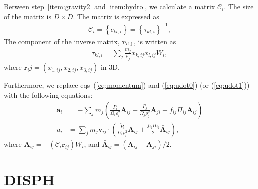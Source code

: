\documentclass[fleqn,dvipdfmx]{article}
\begin{document}
Between step~\ref{item:gravity2} and \ref{item:hydro}, we calculate a
matrix $\mathcal{C}_i$. The size of the matrix is $D \times D$. The
matrix is expressed as
\begin{align}
  \mathcal{C}_i = \left\{ c_{kl,i} \right\} = \left\{ \tau_{kl,i}
  \right\}^{-1},
\end{align}
The component of the inverse matrix, $\tau_{\ij}$, is written as
\begin{align}
  \tau_{kl,i} = \sum_j \frac{m_j}{\rho_j} x_{k,ij} x_{l,ij} W_i,
\end{align}
where $\bm{r}_ij = (x_{1,ij}, x_{2,ij}, x_{3,ij})$ in 3D.

Furthermore, we replace eqs~(\ref{eq:momentum}) and (\ref{eq:udot0})
(or (\ref{eq:udot1})) with the following equations:
\begin{align}
  \bm{a}_i &= - \sum_j m_j \left( \frac{\tilde{P}_i}{\Omega_i
    \rho_i^2} \bm{A}_{ij} - \frac{\tilde{P}_j}{\Omega_j \rho_j^2}
  \bm{A}_{ji} + f_{ij} \Pi_{ij} \bar{\bm{A}}_{ij} \right) \\
  \dot{u}_i &= \sum_j m_j \bm{v}_{ij} \cdot \left(
  \frac{\tilde{P}_i}{\Omega_i \rho_i^2} \bm{A}_{ij} +
  \frac{f_{ij}\Pi_{ij}}{2} \bar{\bm{A}}_{ij} \right),
\end{align}
where $\bm{A}_{ij}=- \left( \mathcal{C}_i \bm{r}_{ij} \right) W_i$,
and $\bar{\bm{A}}_{ij}=\left( \bm{A}_{ij} - \bm{A}_{ji} \right)/2$.

\section{DISPH}
\end{document}

